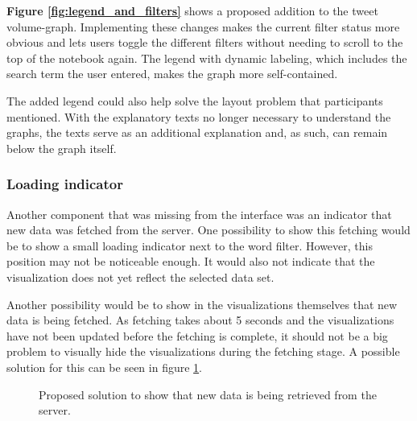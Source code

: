 \textbf{Figure \ref{fig:legend_and_filters}} shows a proposed addition to the tweet volume-graph. Implementing these changes makes the current filter status more obvious and lets users toggle the different filters without needing to scroll to the top of the notebook again. The legend with dynamic labeling, which includes the search term the user entered, makes the graph more self-contained.

The added legend could also help solve the layout problem that participants mentioned. With the explanatory texts no longer necessary to understand the graphs, the texts serve as an additional explanation and, as such, can remain below the graph itself.

\subsubsection*{Loading indicator}
Another component that was missing from the interface was an indicator that new data was fetched from the server. One possibility to show this fetching would be to show a small loading indicator next to the word filter. However, this position may not be noticeable enough. It would also not indicate that the visualization does not yet reflect the selected data set.

Another possibility would be to show in the visualizations themselves that new data is being fetched. As fetching takes about 5 seconds and the visualizations have not been updated before the fetching is complete, it should not be a big problem to visually hide the visualizations during the fetching stage. A possible solution for this can be seen in figure \ref{fig:fetching_state}.

\begin{figure}[htb]
    \caption{Proposed solution to show that new data is being retrieved from the server.}
    \label{fig:fetching_state}
\end{figure}


